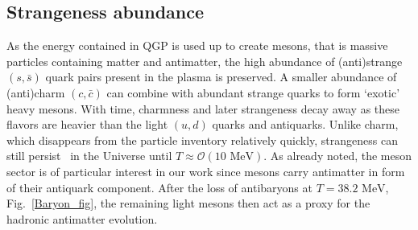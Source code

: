 \documentclass[universe,article,submit,moreauthors,pdftex,a4paper]{Definitions/mdpi}
\newcommand{\MeV}{\text{ MeV}}
\newcommand*{\rf}[1]{Fig.~{\ref{#1}}}
\newcommand*{\xblue}{\color{black}}
\begin{document}
\subsection{Strangeness abundance}\label{sec:Strangeness}
\noindent As the energy contained in QGP is used up {\xblue to create mesons, that is massive particles containing matter and antimatter}, the high abundance of (anti)strange $(s,\bar{s})$ quark pairs present in the plasma is preserved. A smaller abundance of  (anti)charm $(c,\bar{c})$ can combine with abundant strange quarks to form `exotic' heavy mesons. With time, charmness and later strangeness decay away as these flavors are heavier than the light $(u,d)$ quarks and antiquarks. Unlike charm, which disappears from the particle inventory relatively quickly, strangeness can still persist~\cite{Yang:2021bko} in the Universe until $T\approx\mathcal{O}(10\MeV)$. {\xblue As already noted, the meson sector is of particular interest in our work since mesons carry antimatter in form of their antiquark component. After the loss of  antibaryons at $T=38.2\MeV$, \rf{Baryon_fig}, the remaining light mesons then act as a proxy for the hadronic antimatter evolution.}
\end{document}
